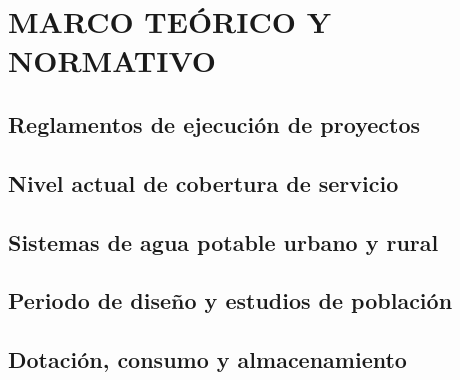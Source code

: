 \chapter{MARCO TEÓRICO Y NORMATIVO}
    \section{Reglamentos de ejecución de proyectos}
    \section{Nivel actual de cobertura de servicio}
    \section{Sistemas de agua potable urbano y rural}
    \section{Periodo de diseño y estudios de población}
    \section{Dotación, consumo y almacenamiento}
